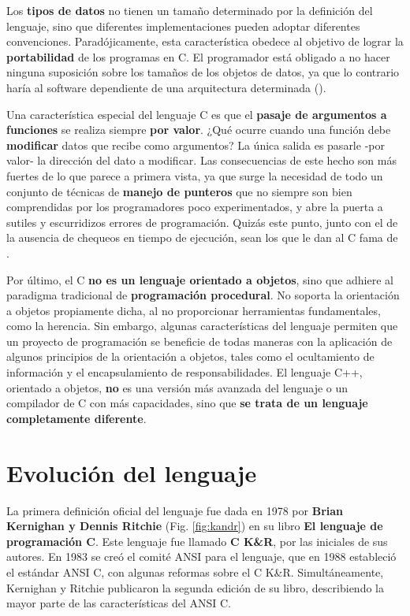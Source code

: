 Los \textbf{tipos de datos} no tienen un tamaño determinado por la definición
del lenguaje, sino que diferentes implementaciones pueden adoptar
diferentes convenciones. Paradójicamente, esta característica
obedece al objetivo de lograr la \textbf{portabilidad} de los programas en C. El
programador está obligado a no hacer ninguna suposición sobre los
tamaños de los objetos de datos, ya que lo contrario haría al
software dependiente de una arquitectura determinada (). 

Una característica especial del lenguaje C es que el \textbf{pasaje de
argumentos a funciones} se realiza siempre \textbf{por valor}. ¿Qué ocurre
cuando una función debe \textbf{modificar} datos que recibe como
argumentos? La única salida es pasarle -por valor- la dirección del
dato a modificar. Las consecuencias de este hecho son más fuertes de
lo que parece a primera vista, ya que surge la necesidad de todo un
conjunto de técnicas de \textbf{manejo de punteros} que no siempre son bien
comprendidas por los programadores poco experimentados, y abre la
puerta a sutiles y escurridizos errores de programación. Quizás
este punto, junto con el de la ausencia de chequeos en tiempo de
ejecución, sean los que le dan al C fama de . 

Por último, el C \textbf{no es un lenguaje orientado a objetos}, sino que
adhiere al paradigma tradicional de \textbf{programación procedural}. No
soporta la orientación a objetos propiamente dicha, al no
proporcionar herramientas fundamentales, como la herencia. Sin embargo,
algunas características del lenguaje permiten que un proyecto de
programación se beneficie de todas maneras con la aplicación de
algunos principios de la orientación a objetos, tales como el
ocultamiento de información y el encapsulamiento de
responsabilidades. El lenguaje C++, orientado a objetos, \textbf{no }es
una versión más avanzada del lenguaje o un compilador de C con
más capacidades, sino que \textbf{se trata de un lenguaje completamente
diferente}. 

\section{Evolución del lenguaje}
La primera definición oficial del lenguaje fue dada en 1978 por
\textbf{Brian Kernighan y Dennis Ritchie} (Fig. \ref{fig:kandr}) en su libro \textbf{El
lenguaje de programación C}. Este lenguaje fue llamado
\textbf{C K\&R}, por las iniciales de sus autores. En 1983 se creó el comité
ANSI para el lenguaje, que en 1988 estableció el estándar ANSI C, con algunas reformas
sobre el C K\&R. Simultáneamente, Kernighan y Ritchie publicaron la
segunda edición de su libro, describiendo la mayor parte de las
características del ANSI C. 


